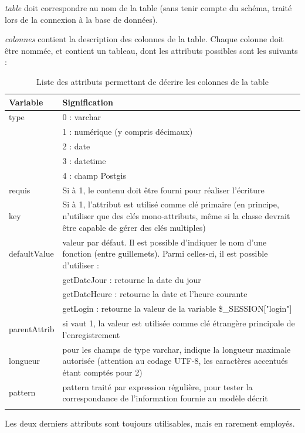 \textit{table} doit correspondre au nom de la table (sans tenir compte du schéma, traité lors de la connexion à la base de données).

\textit{colonnes} contient la description des colonnes de la table. Chaque colonne doit être nommée, et contient un tableau, dont les  attributs possibles sont les suivants :

\begin{longtable}{|p{3cm}|p{10cm}|}
\hline
\textbf{Variable} & \textbf{Signification} \\
\hline
\endhead
type & 0 : varchar \\
& 1 : numérique (y compris décimaux) \\
& 2 : date \\
& 3 : datetime \\
& 4 : champ Postgis \\
\hline
requis & Si à 1, le contenu doit être fourni pour réaliser l'écriture \\
\hline
key & Si à 1, l'attribut est utilisé comme clé primaire (en principe, n'utiliser que des clés mono-attributs, même si la classe devrait être capable de gérer des clés multiples) \\
\hline
defaultValue & valeur par défaut. Il est possible d'indiquer le nom d'une fonction (entre guillemets). Parmi celles-ci, il est possible d'utiliser :\\
& getDateJour : retourne la date du jour \\
& getDateHeure : retourne la date et l'heure courante \\
& getLogin : retourne la valeur de la variable \$\_SESSION["login"]\\
\hline
parentAttrib & si vaut 1, la valeur est utilisée comme clé étrangère principale de l'enregistrement \\
\hline
longueur & pour les champs de type varchar, indique la longueur maximale autorisée (attention au codage UTF-8, les caractères accentués étant comptés pour 2) \\
\hline
pattern & pattern traité par expression régulière, pour tester la correspondance de l'information fournie au modèle décrit \\
\hline

\caption{Liste des attributs permettant de décrire les colonnes de la table}

\end{longtable}

Les deux derniers attributs sont toujours utilisables, mais en rarement employés.

